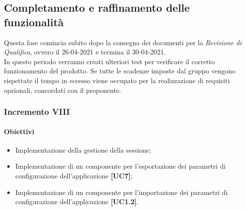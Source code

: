 \subsection{Completamento e raffinamento delle funzionalità}
Questa fase comincia subito dopo la consegna dei documenti per la \textit{Revisione di Qualifica}, ovvero il 26-04-2021 e termina il 30-04-2021.\\
In questo periodo verranno creati ulteriori test per verificare il corretto funzionamento del prodotto. Se tutte le scadenze imposte dal gruppo vengono rispettate il tempo in eccesso viene occupato per la realizzazione di requisiti opzionali, concordati con il proponente. 

\subsubsection{Incremento VIII} 

\paragraph{Obiettivi}
\begin{itemize}
	\item Implementazione della gestione della sessione;
	\item Implementazione di un componente per l'esportazione dei parametri di configurazione dell'applicazione \textbf{[UC7]};
	\item Implementazione di un componente per l'importazione dei parametri di configurazione dell'applicazione \textbf{[UC1.2]}.
\end{itemize}
	
